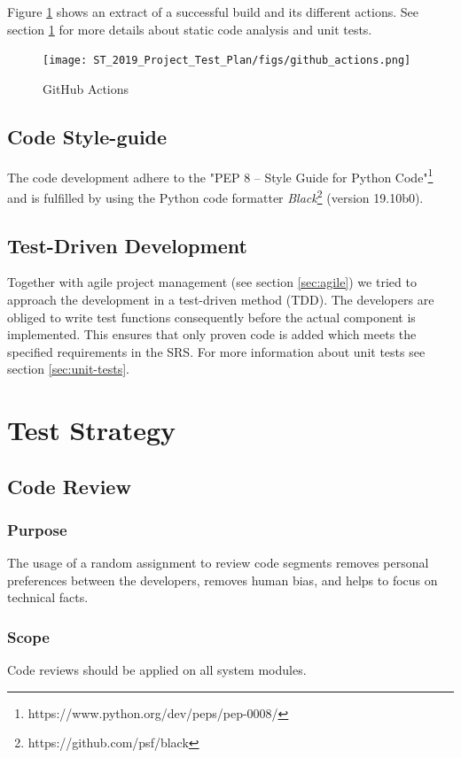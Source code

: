 \documentclass[a4paper]{article}
\begin{document}
Figure \ref{fig:github-action} shows an extract of a successful build and its different actions. See section \ref{sec:test-strategy} for more details about static code analysis and unit tests.

\begin{figure}[H]
\centering
    \texttt{[image: ST\_2019\_Project\_Test\_Plan/figs/github\_actions.png]}
    \caption{GitHub Actions}
    \label{fig:github-action}
\end{figure}



\subsection{Code Style-guide}
The code development adhere to the "PEP 8 -- Style Guide for Python Code"\footnote{https://www.python.org/dev/peps/pep-0008/} and is fulfilled by using the Python code formatter \textit{Black}\footnote{https://github.com/psf/black} (version 19.10b0).


\subsection{Test-Driven Development}
\label{sec:tdd}
Together with agile project management (see section \ref{sec:agile}) we tried to approach the development in a test-driven method (TDD). The developers are obliged to write test functions consequently before the actual component is implemented. This ensures that only proven code is added which meets the specified requirements in the SRS. For more information about unit tests see section \ref{sec:unit-tests}.




\clearpage
\section{Test Strategy} 
\label{sec:test-strategy}
\subsection{Code Review}
\subsubsection*{Purpose}
The usage of a random assignment to review code segments removes personal preferences between the developers, removes human bias, and helps to focus on technical facts.

\subsubsection*{Scope}
Code reviews should be applied on all system modules.
\end{document}
